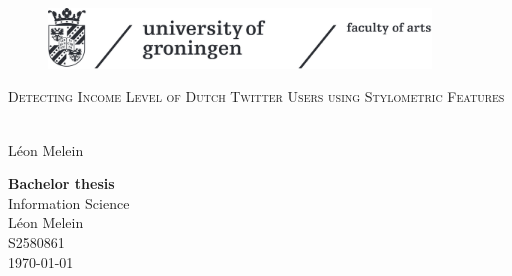 \documentclass[
10pt, %
a4paper, %
oneside, %
headinclude,footinclude, %
] {book}%
\title{\normalfont\spacedallcaps{title}} %
\author{\spacedlowsmallcaps{author}} %
\date{} %
\begin{document}


\pagestyle{scrheadings} %



\hypersetup{pageanchor=false}
\begin{titlepage}
\thispagestyle{empty}
\begin{figure}[h!] %
\includegraphics[width=4in]{ruglogo} 
\end{figure}

\begin{center}
\vspace{30 mm}
\begingroup \linespread{1,75} \selectfont 
\textsc{\LARGE Detecting Income Level of Dutch Twitter Users using Stylometric Features}\\
\\[1,5cm]
\endgroup

Léon Melein\\[2,5cm]

\end{center}
\vfill
\textbf{Bachelor thesis}\\  %
Information Science\\  %
Léon Melein\\
S2580861\\
\today
\end{titlepage}
\hypersetup{pageanchor=true}
\end{document}
